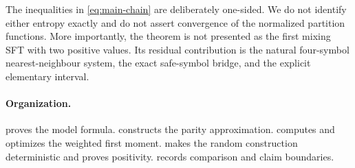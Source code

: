 The inequalities in \eqref{eq:main-chain} are deliberately one-sided.  We do
not identify either entropy exactly and do not assert convergence of the
normalized partition functions.  More importantly, the theorem is not
presented as the first mixing SFT with two positive values.  Its residual
contribution is the natural four-symbol nearest-neighbour system, the exact
safe-symbol bridge, and the explicit elementary interval.

\paragraph{Organization.}
 proves the model formula.
 constructs the parity approximation.
 computes and optimizes the weighted first moment.
 makes the random construction deterministic and proves
positivity.   records comparison and claim boundaries.
